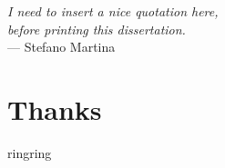 
\begin{flushright}{\slshape
    I need to insert a nice quotation here, \\
    before printing this dissertation.} \\ \medskip
    --- Stefano Martina
\end{flushright}



\bigskip

\begingroup
\let\clearpage\relax
\let\cleardoublepage\relax
\let\cleardoublepage\relax
\chapter*{Thanks}
ringring
\endgroup




